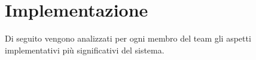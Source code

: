 \section{Implementazione}
Di seguito vengono analizzati per ogni membro del team gli aspetti implementativi più significativi del sistema.
